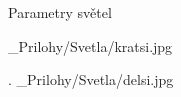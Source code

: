  Parametry světel

{
\medskip
\picw=15cm _Prilohy/Svetla/kratsi.jpg
}
\par { .}
{
\medskip
\picw=15cm _Prilohy/Svetla/delsi.jpg
}

\par